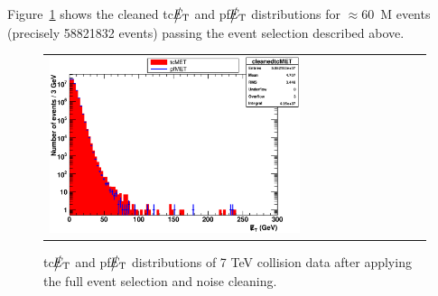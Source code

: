 Figure~\ref{fig:calomet} shows the cleaned tc$\big\slash\hspace{-1.6ex}{E_\text{T}}$ and pf$\big\slash\hspace{-1.6ex}{E_\text{T}}$ distributions for $\approx 60$~M events 
(precisely 58821832 events) passing the event selection described above.
\begin{figure}[h]
 \centering
 \begin{tabular}{ll}
   \includegraphics[width=0.7\textwidth]{fig/met.eps} 
 \end{tabular}
\caption{tc$\big\slash\hspace{-1.6ex}{E_\text{T}}$ and pf$\big\slash\hspace{-1.6ex}{E_\text{T}}$ distributions of 7 TeV collision data after applying the full event selection and noise cleaning.}
\label{fig:calomet}
\end{figure}
